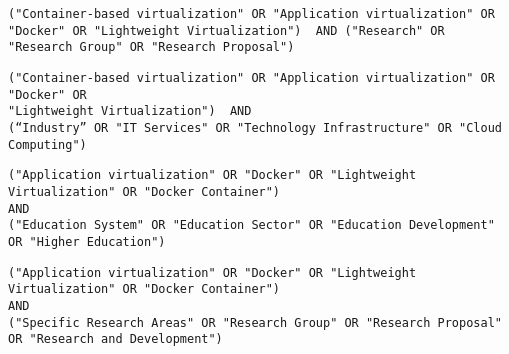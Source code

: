 \begin{tcolorbox}[
  colback=gray!5, 
  colframe=black!60, 
  title=Cadena de búsqueda en Science Direct para investigación, 
  fonttitle=\bfseries, 
  sharp corners=south
]
\scriptsize %
\begin{verbatim}
("Container-based virtualization" OR "Application virtualization" OR 
"Docker" OR "Lightweight Virtualization")  AND ("Research" OR 
"Research Group" OR "Research Proposal")
\end{verbatim}
\end{tcolorbox}

\begin{tcolorbox}[
  colback=gray!5, 
  colframe=black!60, 
  title=Cadena de búsqueda en Science Direct para industria, 
  fonttitle=\bfseries, 
  sharp corners=south
]
\scriptsize %
\begin{verbatim}
("Container-based virtualization" OR "Application virtualization" OR "Docker" OR 
"Lightweight Virtualization")  AND 
(“Industry” OR "IT Services" OR "Technology Infrastructure" OR "Cloud Computing")
\end{verbatim}
\end{tcolorbox}

\begin{tcolorbox}[
  colback=gray!5, 
  colframe=black!60, 
  title=Cadena de búsqueda en Taylor \& Francis para educación, 
  fonttitle=\bfseries, 
  sharp corners=south
]
\scriptsize %
\begin{verbatim}
("Application virtualization" OR "Docker" OR "Lightweight Virtualization" OR "Docker Container")   
AND   
("Education System" OR "Education Sector" OR "Education Development" OR "Higher Education")
\end{verbatim}
\end{tcolorbox}

\begin{tcolorbox}[
  colback=gray!5, 
  colframe=black!60, 
  title=Cadena de búsqueda en Taylor \& Francis para investigación, 
  fonttitle=\bfseries, 
  sharp corners=south
]
\scriptsize %
\begin{verbatim}
("Application virtualization" OR "Docker" OR "Lightweight Virtualization" OR "Docker Container")
AND   
("Specific Research Areas" OR "Research Group" OR "Research Proposal" OR "Research and Development")
\end{verbatim}
\end{tcolorbox}


